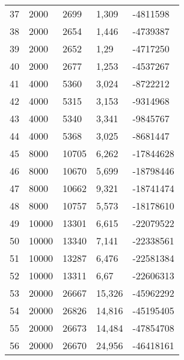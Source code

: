 \begin{longtable}{lllll}
    37               & 2000           & 2699           & 1,309       & -4811598        \\
    38               & 2000           & 2654           & 1,446       & -4739387        \\
    39               & 2000           & 2652           & 1,29        & -4717250        \\
    40               & 2000           & 2677           & 1,253       & -4537267        \\
    41               & 4000           & 5360           & 3,024       & -8722212        \\
    42               & 4000           & 5315           & 3,153       & -9314968        \\
    43               & 4000           & 5340           & 3,341       & -9845767        \\
    44               & 4000           & 5368           & 3,025       & -8681447        \\
    45               & 8000           & 10705          & 6,262       & -17844628       \\
    46               & 8000           & 10670          & 5,699       & -18798446       \\
    47               & 8000           & 10662          & 9,321       & -18741474       \\
    48               & 8000           & 10757          & 5,573       & -18178610       \\
    49               & 10000          & 13301          & 6,615       & -22079522       \\
    50               & 10000          & 13340          & 7,141       & -22338561       \\
    51               & 10000          & 13287          & 6,476       & -22581384       \\
    52               & 10000          & 13311          & 6,67        & -22606313       \\
    53               & 20000          & 26667          & 15,326      & -45962292       \\
    54               & 20000          & 26826          & 14,816      & -45195405       \\
    55               & 20000          & 26673          & 14,484      & -47854708       \\
    56               & 20000          & 26670          & 24,956      & -46418161       \\

\end{longtable}
